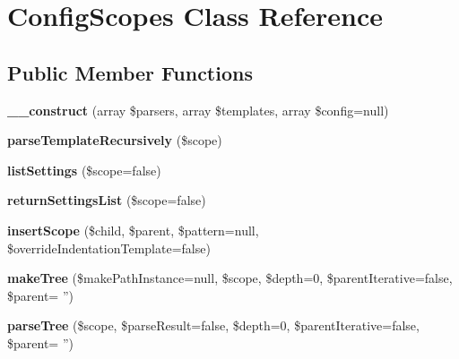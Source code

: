 \hypertarget{class_hypo_conf_1_1_config_scopes}{
\section{\-Config\-Scopes \-Class \-Reference}
\label{class_hypo_conf_1_1_config_scopes}
}
\subsection*{\-Public \-Member \-Functions}
\begin{DoxyCompactItemize}
\item 
\hypertarget{class_hypo_conf_1_1_config_scopes_a86b1c284cc69f009116c696fce93594d}{
{\bfseries \-\_\-\-\_\-construct} (array \$parsers, array \$templates, array \$config=null)}
\label{class_hypo_conf_1_1_config_scopes_a86b1c284cc69f009116c696fce93594d}

\item 
\hypertarget{class_hypo_conf_1_1_config_scopes_a738b6b2793a6b619d58ef27fbcd3c0c5}{
{\bfseries parse\-Template\-Recursively} (\$scope)}
\label{class_hypo_conf_1_1_config_scopes_a738b6b2793a6b619d58ef27fbcd3c0c5}

\item 
\hypertarget{class_hypo_conf_1_1_config_scopes_a70910263dd0c6f497380bfdec897bdc9}{
{\bfseries list\-Settings} (\$scope=false)}
\label{class_hypo_conf_1_1_config_scopes_a70910263dd0c6f497380bfdec897bdc9}

\item 
\hypertarget{class_hypo_conf_1_1_config_scopes_ad4f604e1a909e4f1605deb79522e741a}{
{\bfseries return\-Settings\-List} (\$scope=false)}
\label{class_hypo_conf_1_1_config_scopes_ad4f604e1a909e4f1605deb79522e741a}

\item 
\hypertarget{class_hypo_conf_1_1_config_scopes_a0ea4502fe82b960a219f5c7a7e3965a7}{
{\bfseries insert\-Scope} (\$child, \$parent, \$pattern=null, \$override\-Indentation\-Template=false)}
\label{class_hypo_conf_1_1_config_scopes_a0ea4502fe82b960a219f5c7a7e3965a7}

\item 
\hypertarget{class_hypo_conf_1_1_config_scopes_aacea411d3e74769e55e4ca9a12615382}{
{\bfseries make\-Tree} (\$make\-Path\-Instance=null, \$scope, \$depth=0, \$parent\-Iterative=false, \$parent= '')}
\label{class_hypo_conf_1_1_config_scopes_aacea411d3e74769e55e4ca9a12615382}

\item 
\hypertarget{class_hypo_conf_1_1_config_scopes_ac543a6469807edc3519b14758dc8473e}{
{\bfseries parse\-Tree} (\$scope, \$parse\-Result=false, \$depth=0, \$parent\-Iterative=false, \$parent= '')}
\label{class_hypo_conf_1_1_config_scopes_ac543a6469807edc3519b14758dc8473e}

\end{DoxyCompactItemize}
